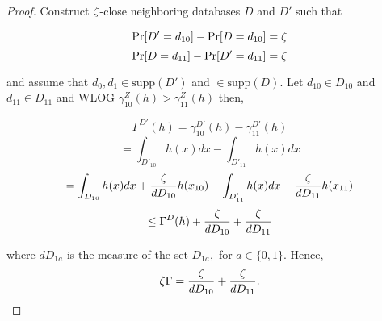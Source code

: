 \begin{proof}
Construct $\zeta$-close neighboring databases $D$ and $D'$ such that

$$\Pr[D'=d_{10}] - \Pr[D=d_{10}] = \zeta$$
$$\Pr[D=d_{11}] - \Pr[D'=d_{11}] = \zeta$$

and assume that $d_0, d_1 \in \text{supp}(D')$ and $\in \text{supp}(D)$. Let $d_{10} \in D_{10}$ and $d_{11} \in D_{11}$ and WLOG $\gamma_{10}^Z(h) > \gamma_{11}^Z(h)$ then,

$$\Gamma^{D'}(h) = \gamma_{10}^{D'}(h) - \gamma_{11}^{D'}(h)$$
$$= \int_{D'_{10}}h(x)dx - \int_{D'_{11}}h(x)dx$$
$$= \int_{D_{10}}h(x)dx + \frac{\zeta}{dD_{10}}h(x_{10}) - \int_{D'_{11}}h(x)dx - \frac{\zeta}{dD_{11}}h(x_{11})$$
$$\leq \Gamma^{D}(h) + \frac{\zeta}{dD_{10}} + \frac{\zeta}{dD_{11}}$$

where $dD_{1a}$ is the measure of the set $D_{1a},$ for $a \in \{0,1\}$. Hence,
$$\zeta\Gamma = \frac{\zeta}{dD_{10}} + \frac{\zeta}{dD_{11}}.$$
\end{proof}
